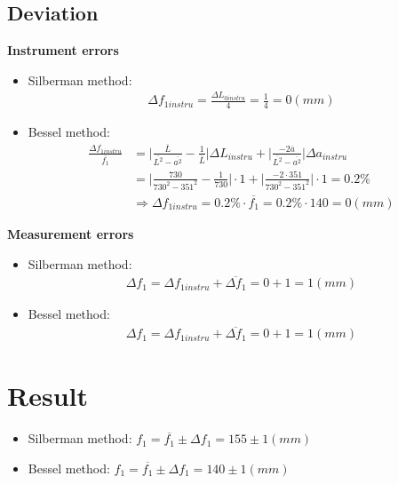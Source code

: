 \documentclass[12pt, a4paper]{article}
\newcommand{\avg}{\overline}
\newcommand{\ra}{\Rightarrow}
\newcommand{\Dt}{\Delta}
\newcommand{\hi}{\section}
\newcommand{\hii}{\subsection}
\begin{document}
    \hii{Deviation}
        \textbf{Instrument errors} \\
        \begin{itemize}
            \item Silberman method:
                \begin{align*}
                    \Dt f_{1 instru} = \frac{\Dt L_{0 instru}}{4} = \frac{1}{4} = 0 (mm)
                \end{align*}
            \item Bessel method:
                \begin{align*}
                    \frac{\Dt f_{1 instru}}{\avg{f_{1}}} &= \big|\frac{\avg{L}}{\avg{L^{2}} - \avg{a^{2}}}
                    - \frac{1}{\avg{L}} \big| \Dt L_{instru} + \big|\frac{-2\avg{a}}{\avg{L^{2}} - \avg{a^{2}}}
                    \big| \Dt a_{instru} \\
                    &= \big|\frac{730}{730^{2} - 351^{2}}
                    - \frac{1}{730} \big| \cdot 1 + \big|\frac{-2 \cdot 351}{730^{2} - 351^{2}}
                    \big| \cdot 1 = 0.2 \% \\
                    & \ra \Dt f_{1 instru} = 0.2 \% \cdot \avg{f_{1}}= 0.2 \% \cdot 140 = 0 (mm)
                \end{align*}

        \end{itemize}
        \textbf{Measurement errors} \\
        \begin{itemize}
            \item Silberman method:
                \begin{align*}
                    \Dt f_{1} = \Dt f_{1 instru} + \avg{\Dt f_{1}} = 0 + 1 = 1(mm)
                \end{align*}
            \item Bessel method:
                \begin{align*}
                    \Dt f_{1} = \Dt f_{1 instru} + \avg{\Dt f_{1}} = 0 + 1 = 1(mm)
                \end{align*}
        \end{itemize}

\hi{Result}
    \begin{tcolorbox}
        \begin{itemize}
            \item Silberman method: $f_{1} = \avg{f_{1}} \pm \Dt f_{1} = 155 \pm 1 (mm)$
            \item Bessel method: $f_{1} = \avg{f_{1}} \pm \Dt f_{1} = 140 \pm 1 (mm)$
        \end{itemize}
    \end{tcolorbox}
\end{document}
